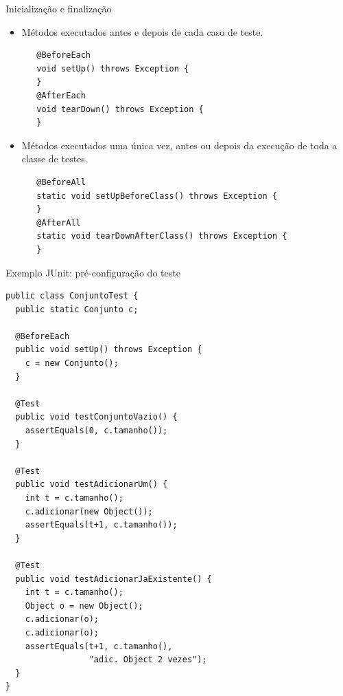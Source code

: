 \documentclass[handout]{beamer}
\begin{document}
\begin{frame}[fragile]{Inicialização e finalização}

\begin{itemize}
\item Métodos executados antes e depois de cada caso de teste. \vspace{-4mm}

\begin{lstlisting}
   @BeforeEach
   void setUp() throws Exception {
   }
   @AfterEach
   void tearDown() throws Exception {
   }
\end{lstlisting}

\item Métodos executados uma única vez, antes ou depois da execução de toda a classe de testes. \vspace{-4mm}

\begin{lstlisting}
   @BeforeAll
   static void setUpBeforeClass() throws Exception {
   }
   @AfterAll
   static void tearDownAfterClass() throws Exception {
   }
\end{lstlisting}
\end{itemize}

\end{frame}

\begin{frame}[fragile]{Exemplo JUnit: pré-configuração do teste}

\setlength{\FrameSep}{1pt}
\begin{framed}
\setlength{\columnsep}{0pt}
\begin{multicols}{2}
\begin{lstlisting}[basicstyle=\tiny]
public class ConjuntoTest {
  public static Conjunto c;

  @BeforeEach
  public void setUp() throws Exception {
    c = new Conjunto();
  }

  @Test
  public void testConjuntoVazio() {
    assertEquals(0, c.tamanho());
  }

  @Test
  public void testAdicionarUm() {
    int t = c.tamanho();
    c.adicionar(new Object());
    assertEquals(t+1, c.tamanho());
  }

  @Test
  public void testAdicionarJaExistente() {
    int t = c.tamanho();
    Object o = new Object();
    c.adicionar(o);
    c.adicionar(o);
    assertEquals(t+1, c.tamanho(), 
                 "adic. Object 2 vezes");
  }
}
\end{lstlisting}
\end{multicols}
\end{framed}

\end{frame}
\end{document}
